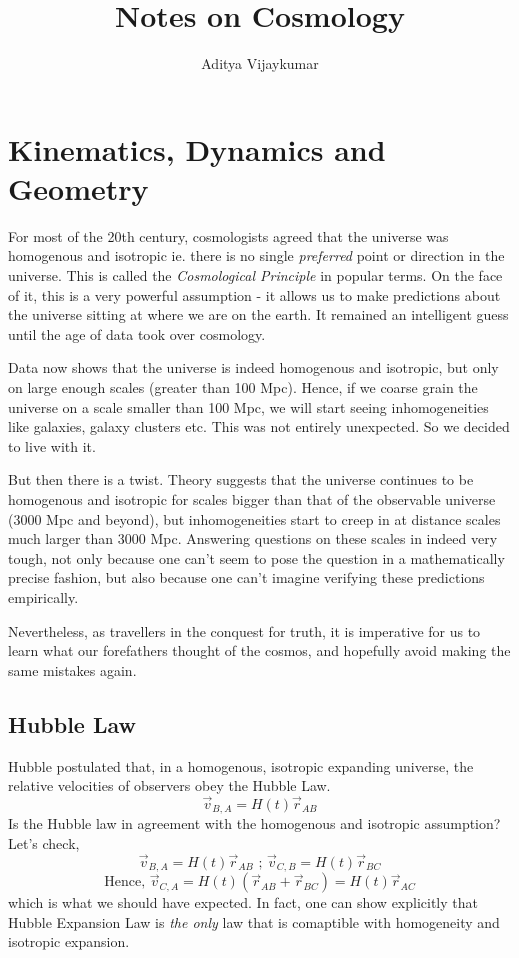 \documentclass[a4paper,11pt]{article}
\title{\textbf{Notes on Cosmology}}
\author{Aditya Vijaykumar}
\affiliation{International Centre for Theoretical Sciences, Bengaluru, India.}
\begin{document}
\maketitle

\section{Kinematics, Dynamics and Geometry}
For most of the 20th century, cosmologists agreed that the universe was homogenous and isotropic ie. there is no single \textit{preferred}  point or direction in the universe. This is called the \textit{Cosmological Principle} in popular terms. On the face of it, this is a very powerful assumption - it allows us to make predictions about the universe sitting at where we are on the earth. It remained an intelligent guess until the age of data took over cosmology.

Data now shows that the universe is indeed homogenous and isotropic, but only on large enough scales (greater than 100 Mpc). Hence, if we coarse grain the universe on a scale smaller than 100 Mpc, we will start seeing inhomogeneities like galaxies, galaxy clusters etc. This was not entirely unexpected. So we decided to live with it.

But then there is a twist. Theory suggests that the universe continues to be homogenous and isotropic for scales bigger than that of the observable universe (3000 Mpc and beyond), but inhomogeneities start to creep in at distance scales much larger than 3000 Mpc. Answering questions on these scales in indeed very tough, not only because one can't seem to pose the question in a mathematically precise fashion, but also because one can't imagine verifying these predictions empirically.

Nevertheless, as travellers in the conquest for truth, it is imperative for us to learn what our forefathers thought of the cosmos, and hopefully avoid making the same mistakes again.

\subsection{Hubble Law}

Hubble postulated that, in a homogenous, isotropic expanding universe, the relative velocities of observers obey the Hubble Law.$$\vec{v}_{B,A}=H(t)\vec{r}_{AB}$$ Is the Hubble law in agreement with the homogenous and isotropic assumption? Let's check,
$$\vec{v}_{B,A}=H(t)\vec{r}_{AB} \text{ ; } \vec{v}_{C,B}=H(t)\vec{r}_{BC}$$
$$\text{Hence, } \vec{v}_{C,A} = H(t)(\vec{r}_{AB} + \vec{r}_{BC}) = H(t)\vec{r}_{AC}$$ which is what we should have expected. In fact, one can show explicitly that Hubble Expansion Law is \textit{the only} law that is comaptible with homogeneity and isotropic expansion.
\end{document}
